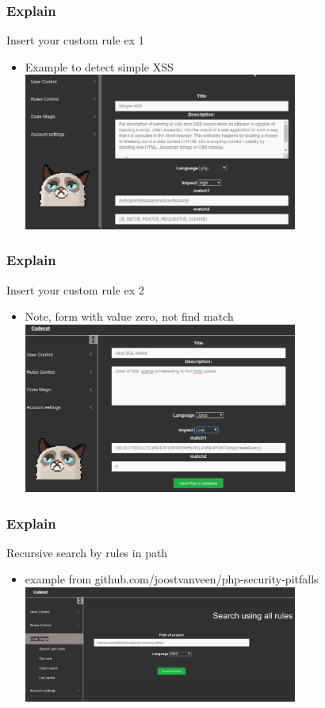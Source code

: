 \documentclass[serif,mathserif]{beamer}
\begin{document}
\begin{frame}
  \frametitle{Explain}
  Insert your custom rule ex 1
  \begin{itemize}
  \item Example to detect simple XSS 	  
  \includegraphics[width=9cm]{images/insertrule2.png} 
  \end{itemize}
\end{frame}

\begin{frame}
  \frametitle{Explain}
  Insert your custom rule ex 2
  \begin{itemize}
  \item Note, form with value zero, not find match	  
  \includegraphics[width=9cm]{images/insertrule.png} 
  \end{itemize}
\end{frame}


\begin{frame}
  \frametitle{Explain}
  Recursive search by rules in path
  \begin{itemize}	
  \item example from github.com/joostvanveen/php-security-pitfalls
  \includegraphics[width=9cm]{images/allsinks.png} 
  \end{itemize}
\end{frame}
\end{document}
